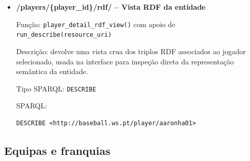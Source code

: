 \begin{itemize}[leftmargin=*]
\begin{Verbatim}[fontsize=\scriptsize,breaklines=true]
    ?team a bb:Team ;
          bb:franchiseOf ?franchise ;
          bb:yearID ?year .

    OPTIONAL { ?team bb:teamName ?teamName . }
    OPTIONAL { ?team bb:teamID ?teamId . }
    OPTIONAL { ?team bb:teamIDBR ?teamIdBr . }
    OPTIONAL { ?team bb:lgID ?league . }
    OPTIONAL { ?team bb:divID ?division . }
    OPTIONAL { ?team bb:Rank ?rank . }
    OPTIONAL { ?team bb:park ?park . }
    OPTIONAL { ?team bb:attendance ?attendance . }
    OPTIONAL { ?team bb:W ?wins . }
    OPTIONAL { ?team bb:L ?losses . }
}
ORDER BY ?franchiseId DESC(?year)
\end{Verbatim}

  \item \textbf{/players/\{player\_id\}/rdf/ -- Vista RDF da entidade}
  
  Fun\c{c}\~ao: \texttt{player\_detail\_rdf\_view()} com apoio de \texttt{run\_describe(resource\_uri)}
  
  Descri\c{c}\~ao: devolve uma vista crua dos triplos RDF associados ao jogador selecionado, usada na interface para inspe\c{c}\~ao direta da representa\c{c}\~ao sem\^antica da entidade.
  
  Tipo SPARQL: \texttt{DESCRIBE}

  SPARQL:

\begin{Verbatim}[fontsize=\scriptsize,breaklines=true]
DESCRIBE <http://baseball.ws.pt/player/aaronha01>
\end{Verbatim}
\end{itemize}

\subsection{Equipas e franquias}

